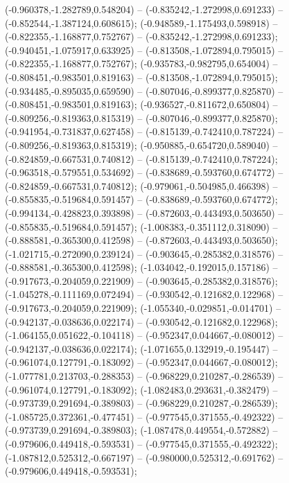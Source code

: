  (-0.960378,-1.282789,0.548204) -- (-0.835242,-1.272998,0.691233) -- (-0.852544,-1.387124,0.608615);
 (-0.948589,-1.175493,0.598918) -- (-0.822355,-1.168877,0.752767) -- (-0.835242,-1.272998,0.691233);
 (-0.940451,-1.075917,0.633925) -- (-0.813508,-1.072894,0.795015) -- (-0.822355,-1.168877,0.752767);
 (-0.935783,-0.982795,0.654004) -- (-0.808451,-0.983501,0.819163) -- (-0.813508,-1.072894,0.795015);
 (-0.934485,-0.895035,0.659590) -- (-0.807046,-0.899377,0.825870) -- (-0.808451,-0.983501,0.819163);
 (-0.936527,-0.811672,0.650804) -- (-0.809256,-0.819363,0.815319) -- (-0.807046,-0.899377,0.825870);
 (-0.941954,-0.731837,0.627458) -- (-0.815139,-0.742410,0.787224) -- (-0.809256,-0.819363,0.815319);
 (-0.950885,-0.654720,0.589040) -- (-0.824859,-0.667531,0.740812) -- (-0.815139,-0.742410,0.787224);
 (-0.963518,-0.579551,0.534692) -- (-0.838689,-0.593760,0.674772) -- (-0.824859,-0.667531,0.740812);
 (-0.979061,-0.504985,0.466398) -- (-0.855835,-0.519684,0.591457) -- (-0.838689,-0.593760,0.674772);
 (-0.994134,-0.428823,0.393898) -- (-0.872603,-0.443493,0.503650) -- (-0.855835,-0.519684,0.591457);
 (-1.008383,-0.351112,0.318090) -- (-0.888581,-0.365300,0.412598) -- (-0.872603,-0.443493,0.503650);
 (-1.021715,-0.272090,0.239124) -- (-0.903645,-0.285382,0.318576) -- (-0.888581,-0.365300,0.412598);
 (-1.034042,-0.192015,0.157186) -- (-0.917673,-0.204059,0.221909) -- (-0.903645,-0.285382,0.318576);
 (-1.045278,-0.111169,0.072494) -- (-0.930542,-0.121682,0.122968) -- (-0.917673,-0.204059,0.221909);
 (-1.055340,-0.029851,-0.014701) -- (-0.942137,-0.038636,0.022174) -- (-0.930542,-0.121682,0.122968);
 (-1.064155,0.051622,-0.104118) -- (-0.952347,0.044667,-0.080012) -- (-0.942137,-0.038636,0.022174);
 (-1.071655,0.132919,-0.195447) -- (-0.961074,0.127791,-0.183092) -- (-0.952347,0.044667,-0.080012);
 (-1.077781,0.213703,-0.288353) -- (-0.968229,0.210287,-0.286539) -- (-0.961074,0.127791,-0.183092);
 (-1.082483,0.293631,-0.382479) -- (-0.973739,0.291694,-0.389803) -- (-0.968229,0.210287,-0.286539);
 (-1.085725,0.372361,-0.477451) -- (-0.977545,0.371555,-0.492322) -- (-0.973739,0.291694,-0.389803);
 (-1.087478,0.449554,-0.572882) -- (-0.979606,0.449418,-0.593531) -- (-0.977545,0.371555,-0.492322);
 (-1.087812,0.525312,-0.667197) -- (-0.980000,0.525312,-0.691762) -- (-0.979606,0.449418,-0.593531);
